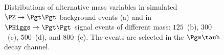 \begin{figure}
\begin{center}
\end{center}
\caption{
  Distributions of alternative mass variables in simulated $\PZ \to \Pgt\Pgt$ background events (a) 
  and in $\PHiggs \to \Pgt\Pgt$ signal events of different mass:
  $125$~\GeV (b), $300$~\GeV (c), $500$~\GeV (d), and $800$~\GeV (e).
  The events are selected in the $\Pgm\tauh$ decay channel.
}
\label{fig:massDistributions_sm_mutau}
\end{figure}

